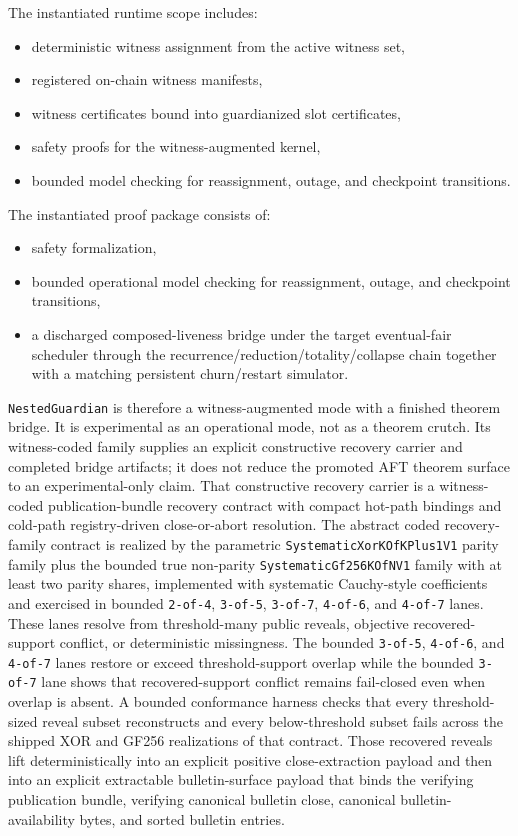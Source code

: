 \documentclass[11pt]{article}
\newcommand{\AFT}{\textsc{AFT}}
\newcommand{\code}[1]{\texttt{#1}}
\begin{document}
The instantiated runtime scope includes:

\begin{itemize}[leftmargin=1.5em]
\item deterministic witness assignment from the active witness set,
\item registered on-chain witness manifests,
\item witness certificates bound into guardianized slot certificates,
\item safety proofs for the witness-augmented kernel,
\item bounded model checking for reassignment, outage, and checkpoint
transitions.
\end{itemize}

The instantiated proof package consists of:

\begin{itemize}[leftmargin=1.5em]
\item safety formalization,
\item bounded operational model checking for reassignment, outage, and
checkpoint transitions,
\item a discharged composed-liveness bridge under the target eventual-fair
scheduler through the recurrence/reduction/totality/collapse chain together
with a matching persistent churn/restart simulator.
\end{itemize}

\code{NestedGuardian} is therefore a witness-augmented mode with a finished
theorem bridge. It is experimental as an operational mode, not as a theorem
crutch. Its witness-coded family supplies an explicit constructive recovery
carrier and completed bridge artifacts; it does not reduce the promoted
\AFT{} theorem surface to an experimental-only claim. That constructive
recovery carrier is a witness-coded publication-bundle recovery contract with
compact hot-path bindings and cold-path registry-driven close-or-abort
resolution. The abstract coded
recovery-family contract is realized by the parametric
\code{SystematicXorKOfKPlus1V1} parity family plus the bounded true non-parity
\code{SystematicGf256KOfNV1} family with at least two parity shares,
implemented with systematic Cauchy-style coefficients and exercised in bounded
\code{2-of-4}, \code{3-of-5}, \code{3-of-7}, \code{4-of-6}, and \code{4-of-7}
lanes. These lanes resolve from threshold-many public reveals, objective
recovered-support conflict, or deterministic missingness. The bounded
\code{3-of-5}, \code{4-of-6}, and \code{4-of-7} lanes restore or exceed
threshold-support overlap while the bounded \code{3-of-7} lane shows that
recovered-support conflict remains fail-closed even when overlap is absent. A
bounded conformance harness checks that every threshold-sized reveal subset
reconstructs and every below-threshold subset fails across the shipped XOR and
GF256 realizations of that contract. Those recovered reveals lift
deterministically into an explicit positive close-extraction payload and then
into an explicit extractable bulletin-surface payload that binds the verifying
publication bundle, verifying canonical bulletin close, canonical
bulletin-availability bytes, and sorted bulletin entries.
\end{document}
